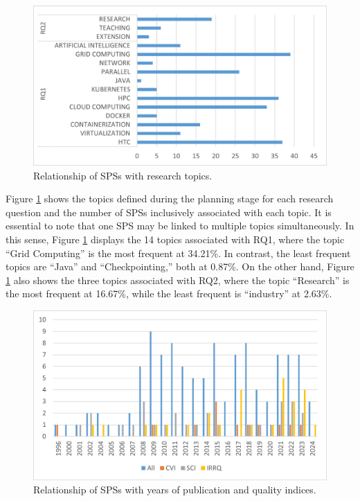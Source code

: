 \begin{figure}[htbp]
	\centering
	\vspace{10pt}
	\includegraphics[scale=0.7]{resources/figures/SPSsByTopic.jpg}
	\vspace{6pt}
	\caption{Relationship of SPSs with research topics.}
	\label{fig:SPSsByTopics}
\end{figure}

Figure \ref{fig:SPSsByTopics} shows the topics defined during the planning stage for each research question and the number of SPSs inclusively associated with each topic. It is essential to note that one SPS may be linked to multiple topics simultaneously. In this sense, Figure \ref{fig:SPSsByTopics} displays the 14 topics associated with RQ1, where the topic ``Grid Computing'' is the most frequent at 34.21\%. In contrast, the least frequent topics are ``Java'' and ``Checkpointing,'' both at 0.87\%. On the other hand, Figure \ref{fig:SPSsByTopics} also shows the three topics associated with RQ2, where the topic ``Research'' is the most frequent at 16.67\%, while the least frequent is ``industry'' at 2.63\%.

\begin{figure}[htbp]
	\centering
	\vspace{10pt}
	\includegraphics[scale=0.7]{resources/figures/SPSsBYearsAndIndexes.jpg}
	\vspace{6pt}
	\caption{Relationship of SPSs with years of publication and quality indices.}
	\label{fig:SPSsByYearsAndIndexes}
\end{figure}


